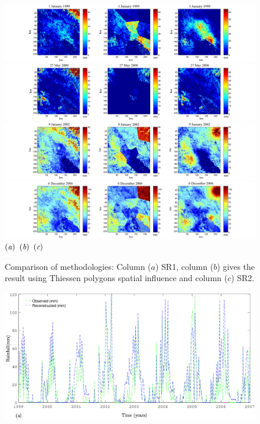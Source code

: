 {\begin{figure}[!htbp]
\begce
\hspace*{-0.8in}\includegraphics[width=1.3\columnwidth]{fig/ComparisonNDVIscaling1_1_1999EE}\\
\hspace*{-0.8in}\includegraphics[width=1.3\columnwidth]{fig/ComparisonNDVIscaling27_5_2000EE}\\ 
\hspace*{-0.8in}\includegraphics[width=1.3\columnwidth]{fig/ComparisonNDVIscaling9_1_2002EE}\\
\hspace*{-0.8in}\includegraphics[width=1.3\columnwidth]{fig/ComparisonNDVIscaling6_12_2006EE}
$\mbox{({\it{a}})}$   \hspace*{1.7in}   $\mbox{({\it{b}})}$ \hspace*{1.9in} $\mbox{({\it{c}})}$
\endce
\caption{Comparison of methodologies: Column ($a$) SR1, column ($b$) gives the result using Thiessen polygons spatial influence and column ($c$) SR2.}
\label{fig:3methodsComparison}
\end{figure}
\begin{figure}[ht]
\begce
\includegraphics[width=\columnwidth]{fig/TimeSeriesComparisonPucara}\\[0.4in]

\end{figure}}
